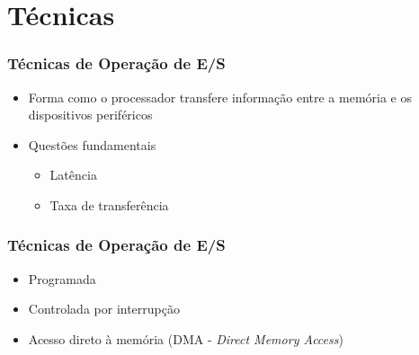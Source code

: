 \documentclass[aspectratio=169,
				xcolor=table]{beamer}
\begin{document}
	
	\section{Técnicas}
	
	\begin{frame}
		\frametitle{Técnicas de Operação de E/S}
		\begin{itemize}
			\item Forma como o processador transfere informação entre a memória e os dispositivos periféricos
			\vspace{1em}
			\item Questões fundamentais
			\begin{itemize}
				\item Latência
				\item Taxa de transferência
			\end{itemize}
		\end{itemize}
	\end{frame}
	
	\begin{frame}
		\frametitle{Técnicas de Operação de E/S}
		\begin{itemize}
			\item Programada
			\vspace{1em}
			\item Controlada por interrupção
			\vspace{1em}
			\item Acesso direto à memória (DMA - \textit{Direct Memory Access})
		\end{itemize}
	\end{frame}
	
\end{document}
